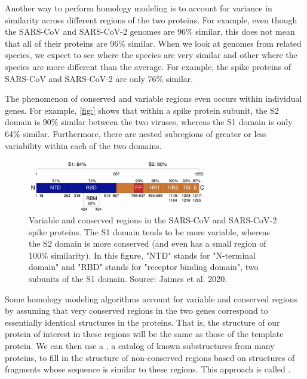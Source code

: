 {{Another way to perform homology modeling is to account for variance in similarity across different regions of the two proteins. For example, even though the SARS-CoV and SARS-CoV-2 genomes are 96\% similar, this does not mean that all of their proteins are 96\% similar. When we look at genomes from related species, we expect to see  where the species are very similar and other  where the species are more different than the average. For example, the spike proteins of SARS-CoV and SARS-CoV-2 are only 76\% similar.

The phenomenon of conserved and variable regions even occurs within individual genes. For example, \autoref{fig:} shows that within a spike protein subunit, the S2 domain is 90\% similar between the two viruses, whereas the S1 domain is only 64\% similar. Furthermore, there are nested subregions of greater or less variability within each of the two domains.

\begin{figure}[h]
	\centering
	\mySfFamily
	\includegraphics[width = 0.7\textwidth]{../images/spike_protein_similarity.png}
	\caption{Variable and conserved regions in the SARS-CoV and SARS-CoV-2 spike proteins. The S1 domain tends to be more variable, whereas the S2 domain is more conserved (and even has a small region of 100\% similarity). In this figure, "NTD" stands for "N-terminal domain" and "RBD" stands for "receptor binding domain", two subunits of the S1 domain. Source: Jaimes et al. 2020.}
	\label{fig:spike_protein_similarity}
\end{figure}

Some homology modeling algorithms account for variable and conserved regions by assuming that very conserved regions in the two genes correspond to essentially identical structures in the proteins. That is, the structure of our protein of interest in these regions will be the same as those of the template protein. We can then use a , a catalog of known substructures from many proteins, to fill in the structure of non-conserved regions based on structures of fragments whose sequence is similar to these regions. This approach is called .

}}
